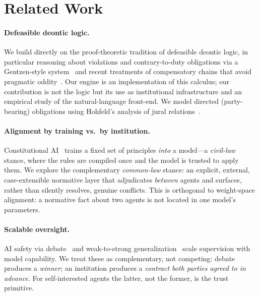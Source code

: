 \documentclass[11pt]{article}
\begin{document}
\section{Related Work}\label{sec:related}
\paragraph{Defeasible deontic logic.} We build directly on the proof-theoretic tradition of
defeasible deontic logic, in particular reasoning about violations and contrary-to-duty
obligations via a Gentzen-style system~\citep{governatori2006violations} and recent treatments
of compensatory chains that avoid pragmatic oddity~\citep{governatori2024oddity}. Our engine
is an implementation of this calculus; our contribution is not the logic but its use as
institutional infrastructure and an empirical study of the natural-language front-end. We model
directed (party-bearing) obligations using Hohfeld's analysis of jural
relations~\citep{hohfeld1913}.

\paragraph{Alignment by training vs.\ by institution.} Constitutional AI~\citep{bai2022constitutional}
trains a fixed set of principles \emph{into} a model---a \emph{civil-law} stance, where the rules
are compiled once and the model is trusted to apply them. We explore the complementary
\emph{common-law} stance: an explicit, external, case-extensible normative layer that adjudicates
\emph{between} agents and surfaces, rather than silently resolves, genuine conflicts. This is
orthogonal to weight-space alignment: a normative fact about two agents is not located in one
model's parameters.

\paragraph{Scalable oversight.} AI safety via debate~\citep{irving2018debate} and
weak-to-strong generalization~\citep{burns2023weak} scale supervision with model capability.
We treat these as complementary, not competing: debate produces a \emph{winner}; an institution
produces a \emph{contract both parties agreed to in advance}. For self-interested agents the latter,
not the former, is the trust primitive.
\end{document}
